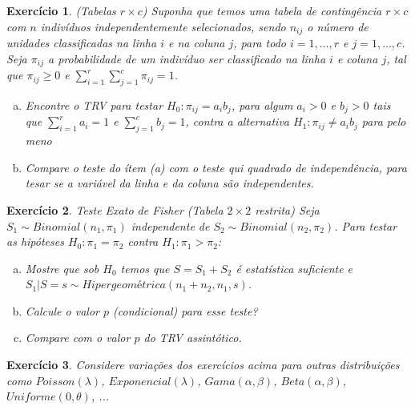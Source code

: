 \documentclass[letter,11pt]{article}
\newtheorem{exer}{Exercício}
\begin{document}
\begin{exer} \rm
\textit{(Tabelas $r \times c$)} Suponha que temos uma tabela de contingência $r \times c$ com $n$ indivíduos independentemente selecionados, sendo $n_{ij}$ o número de unidades classificadas na linha $i$ e na coluna $j$, para todo $i=1, \ldots, r$ e $j=1, \ldots, c$. Seja $\pi_{ij}$ a probabilidade de um indivíduo ser classificado na linha $i$ e coluna $j$, tal que $\pi_{ij} \geq 0$ e $\sum_{i=1}^{r} \sum_{j=1}^{c} \pi_{ij} = 1$.
\begin{enumerate}[a)]
  \item Encontre o TRV para testar $H_0: \pi_{ij} = a_i b_j$, para algum $a_i > 0$ e $b_j>0$ tais que $\sum_{i=1}^r a_i = 1$ e $\sum_{j=1}^c b_j = 1$, contra a alternativa $H_1: \pi_{ij} \neq a_i b_j$ para pelo meno 
  \item Compare o teste do ítem (a) com o teste qui quadrado de independência, para tesar se a variável da linha e da coluna são independentes.
\end{enumerate}
\end{exer}


\begin{exer} \rm
\textit{Teste Exato de Fisher}
\textit{(Tabela $2 \times 2$ restrita)} Seja $S_1 \sim Binomial(n_1, \pi_1)$ independente de $S_2 \sim Binomial(n_2, \pi_2)$. Para testar as hipóteses $H_0: \pi_1 = \pi_2$ contra $H_1: \pi_1 > \pi_2$:
\begin{enumerate}[a)]
  \item Mostre que sob $H_0$ temos que $S = S_1 + S_2$ é estatística suficiente e $S_1 \vert S = s \sim \textit{Hipergeométrica}(n_1+n_2, n_1, s)$.
  \item Calcule o valor $p$ (condicional) para esse teste?  
  \item Compare com o valor $p$ do TRV assintótico.
\end{enumerate}
\end{exer}


\begin{exer} \rm
Considere variações dos exercícios acima para outras distribuições como $Poisson(\lambda)$, $Exponencial(\lambda)$, $Gama(\alpha, \beta)$, $Beta(\alpha, \beta)$, $Uniforme(0, \theta)$, ...
\end{exer}
\end{document}
